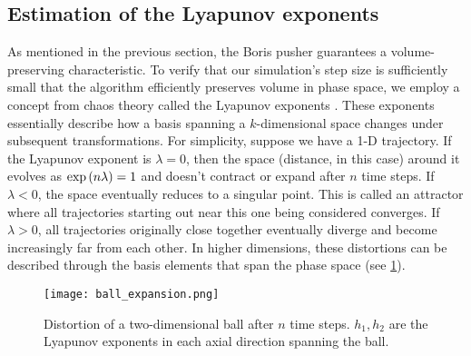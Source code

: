 
\subsection{Estimation of the Lyapunov exponents}\label{sec:sim_LCE}


As mentioned in the previous section, the Boris pusher guarantees a
volume-preserving characteristic. To verify that our simulation's step size is
sufficiently small that the algorithm efficiently preserves volume in phase
space, we employ a concept from chaos theory called the Lyapunov exponents
\citep{Ott2002}. These exponents essentially describe how a basis spanning a $k$-dimensional space changes under subsequent transformations. For simplicity, suppose we have a 1-D trajectory. If the Lyapunov exponent is $\lambda=0$, then the space (distance, in this case) around it evolves as $\exp\qty(n\lambda)=1$
and doesn't contract or expand after $n$ time steps. If $\lambda<0$, the space
eventually reduces to a singular point. This is called an attractor where all
trajectories starting out near this one being considered converges. If
$\lambda>0$, all trajectories originally close together eventually diverge and
become increasingly far from each other. In higher dimensions, these distortions
can be described through the basis elements that span the phase space (see
\cref{fig:ball_expansion}).

\begin{figure}
    \centering
    \texttt{[image: ball\_expansion.png]}
    \caption{Distortion of a two-dimensional ball after $n$ time steps.
    $h_1,h_2$ are the Lyapunov exponents in each axial direction spanning the
ball.}
    \label{fig:ball_expansion}
\end{figure}

